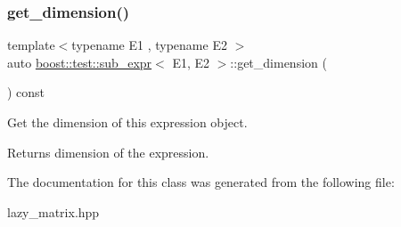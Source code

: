\subsubsection{\texorpdfstring{get\_dimension()}{get\_dimension()}}
{\footnotesize\ttfamily template$<$typename E1 , typename E2 $>$ \\
auto \mbox{\hyperlink{classboost_1_1test_1_1sub__expr}{boost\+::test\+::sub\+\_\+expr}}$<$ E1, E2 $>$\+::get\+\_\+dimension (\begin{DoxyParamCaption}{ }\end{DoxyParamCaption}) const\hspace{0.3cm}{\ttfamily [inline]}}



Get the dimension of this expression object. 

\begin{DoxyReturn}{Returns}
dimension of the expression. 
\end{DoxyReturn}


The documentation for this class was generated from the following file\+:\begin{DoxyCompactItemize}
\item 
lazy\+\_\+matrix.\+hpp\end{DoxyCompactItemize}
